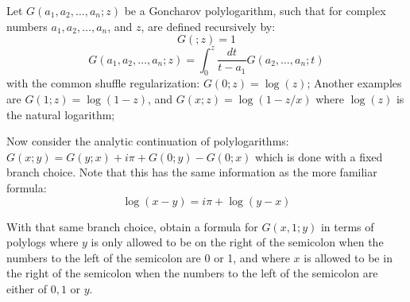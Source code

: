 Let $G(a_1,a_2,\ldots,a_n;z)$ be a Goncharov polylogarithm, such that for complex numbers $a_1,a_2,\ldots,a_n$, and $z$, are defined recursively by:
$$
G(;z)=1
$$
$$
G(a_1,a_2,\ldots,a_n;z) = \int_0^z \frac{dt}{t-a_1} G(a_2,\ldots,a_n;t)
$$
with the common shuffle regularization: $G(0;z)=\log(z)$;
Another examples are $G(1;z)=\log(1-z)$, and $G(x;z)=\log(1-z/x)$ where $\log(z)$ is the natural logarithm;


 Now consider the analytic continuation of polylogarithms: $G(x;y) = G(y;x) + i \pi +G(0;y)-G(0;x)$ which is done with a fixed branch choice. Note that this has the same information as the more familiar formula:
$$\log(x-y) = i\pi+\log(y-x)$$

 With that same branch choice, obtain a formula for $G(x,1;y)$ in terms of polylogs where $y$ is only allowed to be on the right of the semicolon when the numbers to the left of the semicolon are 0 or 1, and where $x$ is allowed to be in the right of the semicolon when the numbers to the left of the semicolon are either of $0,1$ or $y$.
